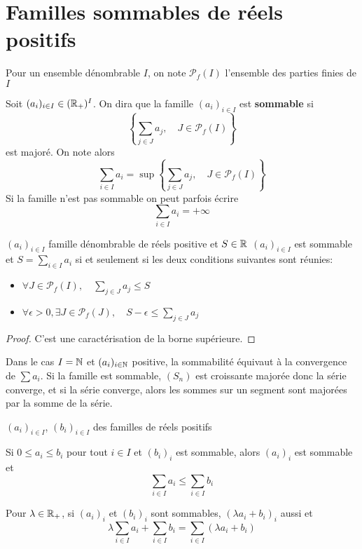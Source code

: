 \section{Familles sommables de réels positifs}

Pour un ensemble dénombrable $I$, on note $\mathcal P_f(I)$ l'ensemble des parties finies de $I$

\begin{dfn}
    Soit $(a_i)_{i\in I}\in (\mathbb R_+)^I$. On dira que la famille $(a_i)_{i\in I}$ est \textbf{sommable} si \[
        \left\{ \sum_{j\in J}a_j, \quad J\in\mathcal P_f(I) \right\}
    \]
    est majoré. On note alors \[
        \sum_{i\in I}a_i=\sup\left\{ \sum_{j\in J}a_j, \quad J\in\mathcal P_f(I) \right\}
    \]
    Si la famille n'est pas sommable on peut parfois écrire \[
        \sum_{i\in I}a_i=+\infty
    \]
\end{dfn}

\begin{prop}
    \Hyp $(a_i)_{i\in I}$ famille dénombrable de réels positive et $S\in \mathbb R$
    \Conc $(a_i)_{i\in I}$ est sommable et $S=\sum_{i\in I}a_i$ si et seulement si les deux conditions suivantes sont réunies: \begin{itemize}[left=2cm]
        \item $\forall J\in\mathcal P_f(I), \quad \displaystyle \sum_{j\in J}a_j\leq S$
        \item $\displaystyle \forall \epsilon>0, \exists J\in\mathcal P_f(J), \quad S-\epsilon\leq \sum_{j\in J}a_j$
    \end{itemize}
\end{prop}

\begin{proof}
    C'est une caractérisation de la borne supérieure.
\end{proof}

\begin{rem}
    Dans le cas $I=\mathbb N$ et $(a_i)_{i\in\mathbb N}$ positive, la sommabilité équivaut à la convergence de $\sum a_i$. Si la famille est sommable, $(S_n)$ est croissante majorée donc la série converge, et si la série converge, alors les sommes sur un segment sont majorées par la somme de la série.
\end{rem}

\begin{prop}
    \Hyp $(a_i)_{i\in I}$, $(b_i)_{i\in I}$ des familles de réels positifs
    \begin{concenum}
    \item Si $0\leq a_i\leq b_i$ pour tout $i\in I$ et $(b_i)_i$ est sommable, alors $(a_i)_i$ est sommable et \[
            \sum_{i\in I}a_i\leq \sum_{i\in I}b_i
        \]
    \item Pour $\lambda\in\mathbb R_+$, si $(a_i)_i$ et $(b_i)_i$ sont sommables, $(\lambda a_i+b_i)_i$ aussi et \[
            \lambda\sum_{i\in I}a_i+\sum_{i\in I}b_i=\sum_{i\in I}(\lambda a_i+b_i)
        \]
    \end{concenum}
\end{prop}

